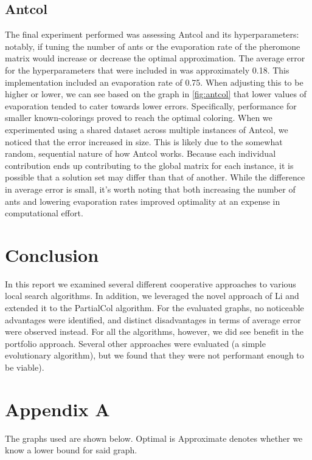 \documentclass[runningheads]{llncs}
\begin{document}
\subsection{Antcol}

The final experiment performed was assessing Antcol and its hyperparameters: notably, if tuning the number of ants or the evaporation rate of the pheromone matrix would increase or decrease the optimal approximation. The average error for the hyperparameters that were included in \cite{10.5555/2851123} was approximately 0.18. This implementation included an evaporation rate of 0.75. When adjusting this to be higher or lower, we can see based on the graph in \ref{fig:antcol} that lower values of evaporation tended to cater towards lower errors. Specifically, performance for smaller known-colorings proved to reach the optimal coloring. When we experimented using a shared dataset across multiple instances of Antcol, we noticed that the error increased in size. This is likely due to the somewhat random, sequential nature of how Antcol works. Because each individual contribution ends up contributing to the global matrix for each instance, it is possible that a solution set may differ than that of another. While the difference in average error is small, it's worth noting that both increasing the number of ants and lowering evaporation rates improved optimality at an expense in computational effort.

\section{Conclusion}
In this report we examined several different cooperative approaches to various local search algorithms. In addition, we leveraged the novel approach of Li and extended it to the PartialCol algorithm. For the evaluated graphs, no noticeable advantages were identified, and distinct disadvantages in terms of average error were observed instead. For all the algorithms, however, we did see benefit in the portfolio approach. Several other approaches were evaluated (a simple evolutionary algorithm), but we found that they were not performant enough to be viable).


\section{Appendix A}

The graphs used are shown below. Optimal is Approximate denotes whether we know a lower bound for said graph.
\end{document}
